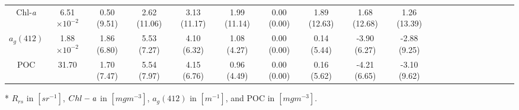 \documentclass[preview]{standalone}
\begin{document}
\begin{threeparttable}
\begin{tabular}{@{\extracolsep{4pt}}Sc ccccccccc ccccccccc@{}}
Chl-\it{a}    	& 6.51$\times10^{-2}$ &   0.50 (9.51) & 2.62 (11.06)& 3.13 (11.17)& 1.99 (11.14)& 0.00 (0.00) & 1.89 (12.63)& 1.68 (12.68)& 1.26 (13.39) 						\\ 
$a_{g}(412)$  	& 1.88$\times10^{-2}$ &    1.86 (6.80)& 5.53 (7.27)& 4.10 (6.32)& 1.08 (4.27)& 0.00 (0.00)& 0.14 (5.44)& -3.90 (6.27)& -2.88  (9.25)					\\ 
POC	       	&  31.70 				&    1.70 (7.47)& 5.54 (7.97)& 4.15 (6.76)& 0.96 (4.49)& 0.00 (0.00)& 0.16 (5.62)& -4.21 (6.65)& -3.10 (9.62) 					\\ \hline


\end{tabular}
\begin{tablenotes}\footnotesize
\item [*] $R_{rs}$ in $[sr^{-1}]$, $Chl-\it{a}$ in $[mg m^{-3}]$, $a_{g}(412)$ in $[m^{-1}]$, and POC in $[mg m^{-3}]$.
\end{tablenotes}
\end{threeparttable}
\end{document}
